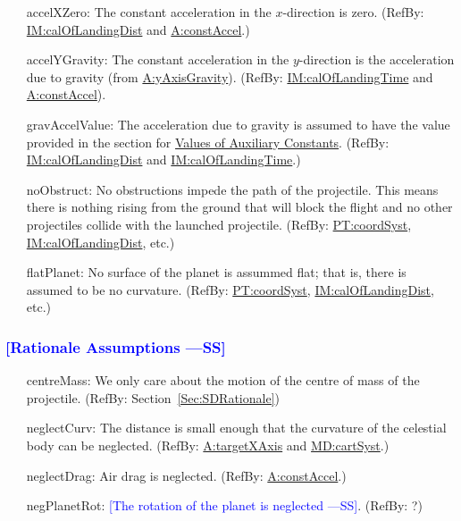 \documentclass[12pt]{article}
\newcommand{\authornote}[3]{\textcolor{#1}{[#3 ---#2]}}
\newcommand{\authornote}[3]{}
\newcommand{\wss}[1]{\authornote{blue}{SS}{#1}}
\begin{document}
\begin{itemize}
\item[accelXZero:\phantomsection\label{accelXZero}]{The constant acceleration in
the $x$-direction is zero. (RefBy:
\hyperref[IM:calOfLandingDist]{IM:calOfLandingDist} and
\hyperref[constAccel]{A:constAccel}.)}
\item[accelYGravity:\phantomsection\label{accelYGravity}]{The constant
acceleration in the $y$-direction is the acceleration due to gravity (from
\hyperref[yAxisGravity]{A:yAxisGravity}). (RefBy:
\hyperref[IM:calOfLandingTime]{IM:calOfLandingTime} and
\hyperref[constAccel]{A:constAccel}).}
\item[gravAccelValue:\phantomsection\label{gravAccelValue}]{The acceleration due
to gravity is assumed to have the value provided in the section for
\hyperref[Sec:AuxConstants]{Values of Auxiliary Constants}. (RefBy:
\hyperref[IM:calOfLandingDist]{IM:calOfLandingDist} and
\hyperref[IM:calOfLandingTime]{IM:calOfLandingTime}.)}
\item[noObstruct:\phantomsection\label{noObstruct}]{No obstructions impede the path of the projectile.  This means there is nothing rising from the ground that will block the flight and no other projectiles collide with the launched projectile. (RefBy: \hyperref[PT:coordSyst]{PT:coordSyst}, \hyperref[IM:calOfLandingDist]{IM:calOfLandingDist}, etc.)}
\item[flatPlanet:\phantomsection\label{flatPlanet}]{No surface of the planet is assummed flat; that is, there is assumed to be no curvature. (RefBy: \hyperref[PT:coordSyst]{PT:coordSyst}, \hyperref[IM:calOfLandingDist]{IM:calOfLandingDist}, etc.)}

\end{itemize}

\subsubsection{\wss{Rationale Assumptions}}

\begin{itemize}
\item[centreMass:\phantomsection\label{centreMass}]{We only care about the motion of the centre of mass of the projectile. (RefBy: Section~\ref{Sec:SDRationale})}
\item[neglectCurv:\phantomsection\label{neglectCurv}]{The distance is small enough that the curvature of the celestial body can be neglected. (RefBy: \hyperref[targetXAxis]{A:targetXAxis} and \hyperref[MD:cartSyst]{MD:cartSyst}.)}
\item[neglectDrag:\phantomsection\label{neglectDrag}]{Air drag is neglected. (RefBy: \hyperref[constAccel]{A:constAccel}.)}
\item[negPlanetRot:\phantomsection\label{negEarthRot}]{\wss{The rotation of the
planet is neglected}. (RefBy: ?)}

\end{itemize}
\end{document}
